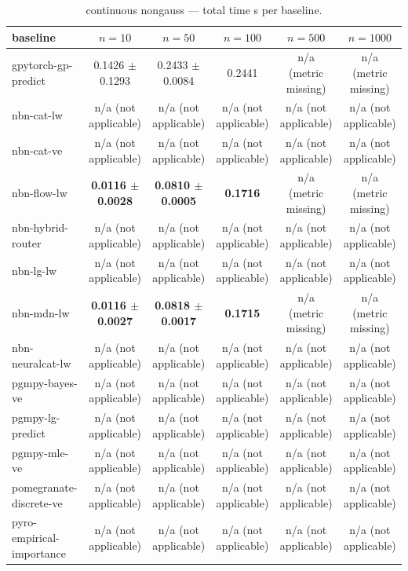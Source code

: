 \begin{table}[h]
\centering
\caption{continuous nongauss — total time s per baseline.}
\label{tab:continuous_nongauss_total_time_s}
\begin{tabular}{lccccc}
\toprule
baseline & $n=10$ & $n=50$ & $n=100$ & $n=500$ & $n=1000$ \\
\midrule
gpytorch-gp-predict & 0.1426 $\pm$ 0.1293 & 0.2433 $\pm$ 0.0084 & 0.2441 & n/a (metric missing) & n/a (metric missing) \\
nbn-cat-lw & n/a (not applicable) & n/a (not applicable) & n/a (not applicable) & n/a (not applicable) & n/a (not applicable) \\
nbn-cat-ve & n/a (not applicable) & n/a (not applicable) & n/a (not applicable) & n/a (not applicable) & n/a (not applicable) \\
nbn-flow-lw & \textbf{0.0116 $\pm$ 0.0028} & \textbf{0.0810 $\pm$ 0.0005} & \textbf{0.1716} & n/a (metric missing) & n/a (metric missing) \\
nbn-hybrid-router & n/a (not applicable) & n/a (not applicable) & n/a (not applicable) & n/a (not applicable) & n/a (not applicable) \\
nbn-lg-lw & n/a (not applicable) & n/a (not applicable) & n/a (not applicable) & n/a (not applicable) & n/a (not applicable) \\
nbn-mdn-lw & \textbf{0.0116 $\pm$ 0.0027} & \textbf{0.0818 $\pm$ 0.0017} & \textbf{0.1715} & n/a (metric missing) & n/a (metric missing) \\
nbn-neuralcat-lw & n/a (not applicable) & n/a (not applicable) & n/a (not applicable) & n/a (not applicable) & n/a (not applicable) \\
pgmpy-bayes-ve & n/a (not applicable) & n/a (not applicable) & n/a (not applicable) & n/a (not applicable) & n/a (not applicable) \\
pgmpy-lg-predict & n/a (not applicable) & n/a (not applicable) & n/a (not applicable) & n/a (not applicable) & n/a (not applicable) \\
pgmpy-mle-ve & n/a (not applicable) & n/a (not applicable) & n/a (not applicable) & n/a (not applicable) & n/a (not applicable) \\
pomegranate-discrete-ve & n/a (not applicable) & n/a (not applicable) & n/a (not applicable) & n/a (not applicable) & n/a (not applicable) \\
pyro-empirical-importance & n/a (not applicable) & n/a (not applicable) & n/a (not applicable) & n/a (not applicable) & n/a (not applicable) \\
\bottomrule
\end{tabular}
\end{table}

